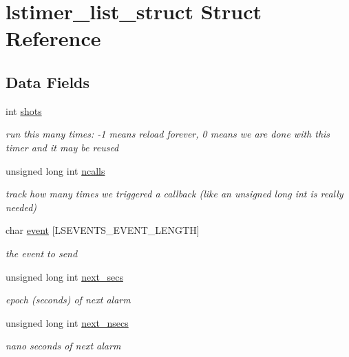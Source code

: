 \hypertarget{structlstimer__list__struct}{
\section{lstimer\_\-list\_\-struct Struct Reference}
\label{structlstimer__list__struct}
}
\subsection*{Data Fields}
\begin{DoxyCompactItemize}
\item 
int \hyperlink{structlstimer__list__struct_ac7ab4cd1f3065156f95b49e66bf05283}{shots}
\begin{DoxyCompactList}\small\item\em run this many times: -\/1 means reload forever, 0 means we are done with this timer and it may be reused \item\end{DoxyCompactList}\item 
unsigned long int \hyperlink{structlstimer__list__struct_aa56c5b8ce7fa0ae93132cb9908195836}{ncalls}
\begin{DoxyCompactList}\small\item\em track how many times we triggered a callback (like an unsigned long int is really needed) \item\end{DoxyCompactList}\item 
char \hyperlink{structlstimer__list__struct_a54d564e392315b2730278bb925803184}{event} \mbox{[}LSEVENTS\_\-EVENT\_\-LENGTH\mbox{]}
\begin{DoxyCompactList}\small\item\em the event to send \item\end{DoxyCompactList}\item 
unsigned long int \hyperlink{structlstimer__list__struct_af0dcaad37472462c9f27d54ed0ceb75d}{next\_\-secs}
\begin{DoxyCompactList}\small\item\em epoch (seconds) of next alarm \item\end{DoxyCompactList}\item 
unsigned long int \hyperlink{structlstimer__list__struct_ab115115d5be7933f98a094b46b6583bb}{next\_\-nsecs}
\begin{DoxyCompactList}\small\item\em nano seconds of next alarm \item\end{DoxyCompactList}\item 

\end{DoxyCompactItemize}
